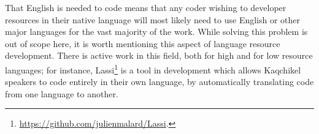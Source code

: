 That English is needed to code means that any coder wishing to developer resources in their native language will most likely need to use English or other major languages for the vast majority of the work. While solving this problem is out of scope here, it is worth mentioning this aspect of language resource development. There is active work in this field, both for high and for low resource languages; for instance, Lassi\footnote{\href{https://github.com/julienmalard/Lassi}{https://github.com/julienmalard/Lassi}. } is a tool in development which allows Kaqchikel speakers to code entirely in their own language, by automatically translating code from one language to another.

